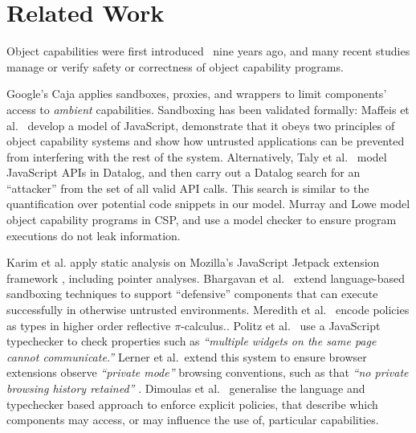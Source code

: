 \section{Related Work}



Object capabilities were first introduced~\cite{MillerPhD} nine
years ago, and many recent %
studies manage
or verify  safety or correctness of object capability programs.

Google's Caja \cite{Caja} applies   sandboxes, proxies, and wrappers
 to limit components'
access to \textit{ambient} capabilities.
Sandboxing has been validated
formally: Maffeis et al.\ \cite{mmt-oakland10} develop a model of
JavaScript, demonstrate that it obeys two principles of
object capability systems
and show  how untrusted applications can be prevented from interfering with
the rest of the system.  Alternatively, Taly et al.\ \cite{secureJS}
  model  JavaScript APIs in Datalog, and then
carry out a Datalog search for an ``attacker'' from the set of all
valid API calls.  This search is similar to the quantification over
potential code snippets in our model.
Murray and Lowe \cite{murray10-infoflow} model object capability
programs in CSP, and use a model checker to ensure program executions
do not leak information.

Karim et al. apply static analysis on
Mozilla's JavaScript Jetpack extension framework \cite{adsafe}, including
 pointer analyses. %
Bhargavan et al.\ \cite{DefJS}
extend language-based sandboxing techniques to support ``defensive''
components that can execute successfully  in otherwise untrusted
environments. Meredith et al.\
\cite{PolicyAsTypes}
 encode policies as types in higher order reflective $\pi$-calculus..  Politz et
al.\ \cite{ADsafety} use a JavaScript typechecker to check
properties such as
 \textit{``multiple widgets on the same page
  cannot communicate.''}
Lerner et al.\ extend this system to ensure browser
extensions observe \textit{``private mode''} browsing conventions,
such as that \textit{``no private browsing history retained''}
\cite{Lerner2013b}.  Dimoulas et al.\ \cite{DPCC14} generalise the
language and typechecker based approach to enforce explicit policies,
that  describe  which components  may
access, or may influence the use of, particular capabilities.

